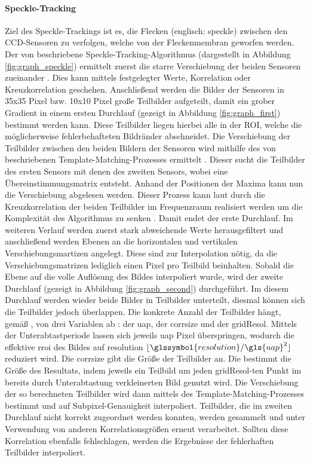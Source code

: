 \paragraph{Speckle-Tracking}
\label{sec:speckle-tracking}
Ziel des Speckle-Trackings ist es, die Flecken (englisch: speckle) zwischen den \gls{CCD}-Sensoren zu verfolgen, welche von der Fleckenmembran geworfen werden. 
Der von \citeauthor{Ber13} beschriebene Speckle-Tracking-Algorithmus (dargestellt in Abbildung \ref{fig:graph_speckle}) ermittelt zuerst die starre Verschiebung der beiden Sensoren zueinander . Dies kann mittels festgelegter Werte, Korrelation oder Kreuzkorrelation geschehen. Anschließend werden die Bilder der Sensoren in 35x35 Pixel bzw. 10x10 Pixel große Teilbilder aufgeteilt, damit ein grober Gradient in einem ersten Durchlauf (gezeigt in Abbildung \ref{fig:graph_first}) bestimmt werden kann. Diese Teilbilder liegen hierbei alle in der \gls{ROI}, welche die möglicherweise fehlerbehafteten Bildränder abschneidet. Die Verschiebung der Teilbilder zwischen den beiden Bildern der Sensoren wird mithilfe des von \citeauthor{Lew94} beschriebenen Template-Matching-Prozesses ermittelt \cite{Lew94}. Dieser sucht die Teilbilder des ersten Sensors mit denen des zweiten Sensors, wobei eine Übereinstimmungsmatrix entsteht. Anhand der Positionen der Maxima kann nun die Verschiebung abgelesen werden. Dieser Prozess kann laut \citeauthor{Lew94} durch die Kreuzkorrelation der beiden Teilbilder im Frequenzraum realisiert werden um die Komplexität des Algorithmus zu senken \cite{Lew94}. Damit endet der erste Durchlauf. 
Im weiteren Verlauf werden zuerst stark abweichende Werte herausgefiltert und anschließend werden Ebenen an die horizontalen und vertikalen Verschiebungsmartizen angelegt. Diese sind zur Interpolation nötig, da die Verschiebungsmatrizen lediglich einen Pixel pro Teilbild beinhalten. Sobald die Ebene auf die volle Auflösung des Bildes interpoliert wurde, wird der zweite Durchlauf (gezeigt in Abbildung \ref{fig:graph_second}) durchgeführt. Im diesem Durchlauf werden wieder beide Bilder in Teilbilder unterteilt, diesmal können sich die Teilbilder jedoch überlappen. Die konkrete Anzahl der Teilbilder hängt, gemäß \citeauthor{Coj17}, von drei Variablen ab \cite{Coj17}: der \gls{uap}, der \gls{corrsize} und der \gls{gridResol}. Mittels der Unterabtastperiode lassen sich jeweils \gls{uap} Pixel überspringen, wodurch die effektive \gls{rroi} des Bildes auf \glsdesc{resolution} $\lfloor\glssymbol{resolution}/\gls{uap}^2\rfloor$ reduziert wird. Die  \gls{corrsize} gibt die Größe der Teilbilder an. Die  bestimmt die Größe des Resultats, indem jeweils ein Teilbild um jeden \gls{gridResol}-ten Punkt im bereits durch Unterabtastung verkleinerten Bild genutzt wird. 
Die Verschiebung der so berechneten Teilbilder wird dann mittels des Template-Matching-Prozesses bestimmt und auf Subpixel-Genauigkeit interpoliert. 
Teilbilder, die im zweiten Durchlauf nicht korrekt zugeordnet werden konnten, werden gesammelt und unter Verwendung von anderen Korrelationsgrößen erneut verarbeitet. Sollten diese Korrelation ebenfalls fehlschlagen, werden die Ergebnisse der fehlerhaften Teilbilder interpoliert. 

